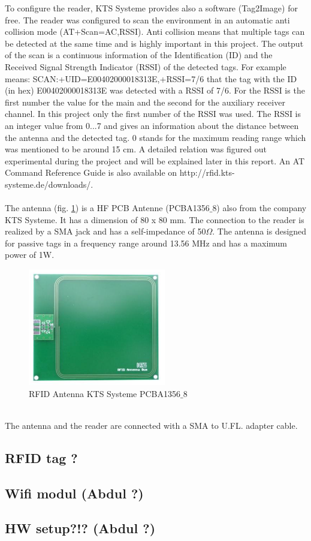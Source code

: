 To configure the reader, KTS Systeme provides also a software (Tag2Image) for free. The reader was configured to scan the environment in an automatic anti collision mode (AT+Scan=AC,RSSI). Anti collision means that multiple tags can be detected at the same time and is highly important in this project. The output of the scan is a continuous information of the Identification (ID) and the Received Signal Strength Indicator (RSSI) of the detected tags. For example means: SCAN:+UID=E00402000018313E,+RSSI=7/6 that the tag with the ID (in hex) E00402000018313E was detected with a RSSI of 7/6. For the RSSI is the first number the value for the main and the second for the auxiliary receiver channel. In this project only the first number of the RSSI was used. The RSSI is an integer value from 0...7 and gives an information about the distance between the antenna and the detected tag. 0 stands for the maximum reading range which was mentioned to be around 15 cm. A detailed relation was figured out experimental during the project and will be explained later in this report. An AT Command Reference Guide is also available on http://rfid.kts-systeme.de/downloads/.\\
\\
The antenna (fig. \ref{Antenna}) is a HF PCB Antenne (PCBA1356$\_$8) also from the company KTS Systeme. It has a dimension of 80 x 80 mm. The connection to the reader is realized by a SMA jack and has a self-impedance of 50$\Omega$. The antenna is designed for passive tags in a frequency range around 13.56 MHz and has a maximum power of 1W. \\
\begin{figure}[!htbp]
\centering
\includegraphics[width = 6cm]{Pictures/Antenna}
\caption{RFID Antenna KTS Systeme PCBA1356$\_$8}
\label{Antenna}
\end{figure}\\
The antenna and the reader are connected with a SMA to U.FL. adapter cable.\\

\subsection{RFID tag ?}

\subsection{Wifi modul (Abdul ?)}

\subsection{HW setup?!? (Abdul ?)}\label{Sec_Har_Set}